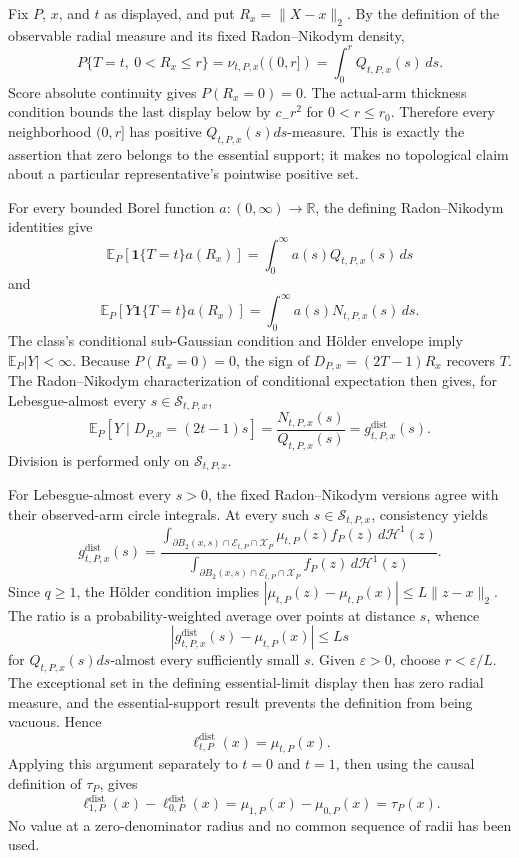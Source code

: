 Fix \(P\), \(x\), and \(t\) as displayed, and put \(R_x=\lVert X-x\rVert_2\).  By the definition of the observable radial measure and its fixed Radon--Nikodym density,
\[
 P\{T=t,\ 0<R_x\leq r\}
 =\nu_{t,P,x}((0,r])
 =\int_0^rQ_{t,P,x}(s)\,ds.
\]
Score absolute continuity gives \(P(R_x=0)=0\).  The actual-arm thickness condition bounds the last display below by \(c_-r^2\) for \(0<r\leq r_0\).  Therefore every neighborhood \((0,r]\) has positive \(Q_{t,P,x}(s)ds\)-measure.  This is exactly the assertion that zero belongs to the essential support; it makes no topological claim about a particular representative's pointwise positive set.

For every bounded Borel function \(a:(0,\infty)\to\mathbb R\), the defining Radon--Nikodym identities give
\[
 \mathbb E_P[\mathbf1\{T=t\}a(R_x)]
 =\int_0^\infty a(s)Q_{t,P,x}(s)\,ds
\]
and
\[
 \mathbb E_P[Y\mathbf1\{T=t\}a(R_x)]
 =\int_0^\infty a(s)N_{t,P,x}(s)\,ds.
\]
The class's conditional sub-Gaussian condition and H\"older envelope imply \(\mathbb E_P|Y|<\infty\).  Because \(P(R_x=0)=0\), the sign of \(D_{P,x}=(2T-1)R_x\) recovers \(T\).  The Radon--Nikodym characterization of conditional expectation then gives, for Lebesgue-almost every \(s\in\mathcal S_{t,P,x}\),
\[
 \mathbb E_P[Y\mid D_{P,x}=(2t-1)s]
 =\frac{N_{t,P,x}(s)}{Q_{t,P,x}(s)}
 =g^{\mathrm{dist}}_{t,P,x}(s).
\]
Division is performed only on \(\mathcal S_{t,P,x}\).

For Lebesgue-almost every \(s>0\), the fixed Radon--Nikodym versions agree with their observed-arm circle integrals.  At every such \(s\in\mathcal S_{t,P,x}\), consistency yields
\[
 g^{\mathrm{dist}}_{t,P,x}(s)
 =\frac{\int_{\partial B_2(x,s)\cap\mathcal E_{t,P}\cap\mathcal X_P}
 \mu_{t,P}(z)f_P(z)\,d\mathcal H^1(z)}
 {\int_{\partial B_2(x,s)\cap\mathcal E_{t,P}\cap\mathcal X_P}
 f_P(z)\,d\mathcal H^1(z)}.
\]
Since \(q\geq1\), the H\"older condition implies \(|\mu_{t,P}(z)-\mu_{t,P}(x)|\leq L\lVert z-x\rVert_2\).  The ratio is a probability-weighted average over points at distance \(s\), whence
\[
 |g^{\mathrm{dist}}_{t,P,x}(s)-\mu_{t,P}(x)|\leq Ls
\]
for \(Q_{t,P,x}(s)ds\)-almost every sufficiently small \(s\).  Given \(\varepsilon>0\), choose \(r<\varepsilon/L\).  The exceptional set in the defining essential-limit display then has zero radial measure, and the essential-support result prevents the definition from being vacuous.  Hence
\[
 \ell^{\mathrm{dist}}_{t,P}(x)=\mu_{t,P}(x).
\]
Applying this argument separately to \(t=0\) and \(t=1\), then using the causal definition of \(\tau_P\), gives
\[
 \ell^{\mathrm{dist}}_{1,P}(x)-\ell^{\mathrm{dist}}_{0,P}(x)
 =\mu_{1,P}(x)-\mu_{0,P}(x)=\tau_P(x).
\]
No value at a zero-denominator radius and no common sequence of radii has been used.